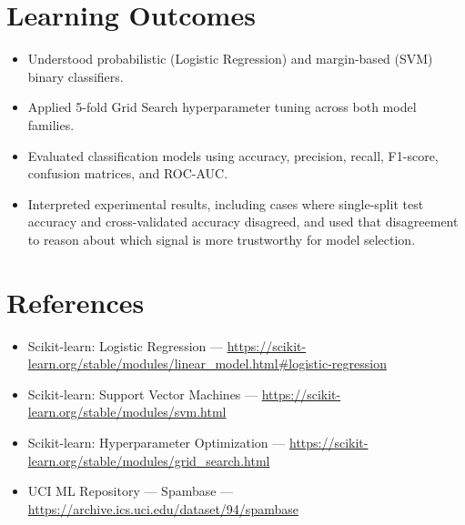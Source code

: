\documentclass[11pt]{article}
\begin{document}
\section{Learning Outcomes}
\begin{itemize}[leftmargin=*]
  \item Understood probabilistic (Logistic Regression) and margin-based (SVM) binary classifiers.
  \item Applied 5-fold Grid Search hyperparameter tuning across both model families.
  \item Evaluated classification models using accuracy, precision, recall, F1-score, confusion matrices, and ROC-AUC.
  \item Interpreted experimental results, including cases where single-split test accuracy and cross-validated accuracy disagreed, and used that disagreement to reason about which signal is more trustworthy for model selection.
\end{itemize}

\section*{References}
\begin{itemize}[leftmargin=*]
  \item Scikit-learn: Logistic Regression --- \url{https://scikit-learn.org/stable/modules/linear_model.html#logistic-regression}
  \item Scikit-learn: Support Vector Machines --- \url{https://scikit-learn.org/stable/modules/svm.html}
  \item Scikit-learn: Hyperparameter Optimization --- \url{https://scikit-learn.org/stable/modules/grid_search.html}
  \item UCI ML Repository --- Spambase --- \url{https://archive.ics.uci.edu/dataset/94/spambase}
\end{itemize}
\end{document}
